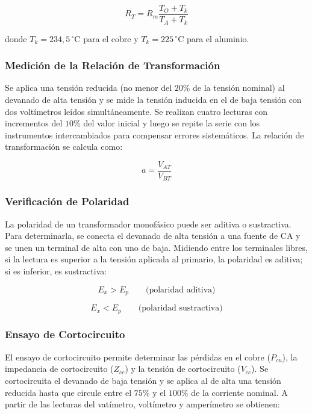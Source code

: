 \begin{equation}
R_T=R_m\frac{T_O+T_k}{T_A+T_k}
\end{equation}

donde $T_k=234,5\,^{\circ}\mathrm{C}$ para el cobre y $T_k=225\,^{\circ}\mathrm{C}$ para el aluminio.

\subsubsection{Medición de la Relación de Transformación}

Se aplica una tensión reducida (no menor del $20\%$ de la tensión nominal) al devanado de alta tensión y se mide la tensión inducida en el de baja tensión con dos voltímetros leídos simultáneamente. Se realizan cuatro lecturas con incrementos del $10\%$ del valor inicial y luego se repite la serie con los instrumentos intercambiados para compensar errores sistemáticos. La relación de transformación se calcula como:

\begin{equation}
a=\frac{V_{AT}}{V_{BT}}
\end{equation}

\subsubsection{Verificación de Polaridad}

La polaridad de un transformador monofásico puede ser aditiva o sustractiva. Para determinarla, se conecta el devanado de alta tensión a una fuente de CA y se unen un terminal de alta con uno de baja. Midiendo entre los terminales libres, si la lectura es superior a la tensión aplicada al primario, la polaridad es aditiva; si es inferior, es sustractiva:

\begin{equation}
E_x>E_p\qquad\text{(polaridad aditiva)}
\end{equation}

\begin{equation}
E_x<E_p\qquad\text{(polaridad sustractiva)}
\end{equation}

\subsubsection{Ensayo de Cortocircuito}

El ensayo de cortocircuito permite determinar las pérdidas en el cobre ($P_{cu}$), la impedancia de cortocircuito ($Z_{cc}$) y la tensión de cortocircuito ($V_{cc}$). Se cortocircuita el devanado de baja tensión y se aplica al de alta una tensión reducida hasta que circule entre el $75\%$ y el $100\%$ de la corriente nominal. A partir de las lecturas del vatímetro, voltímetro y amperímetro se obtienen:

